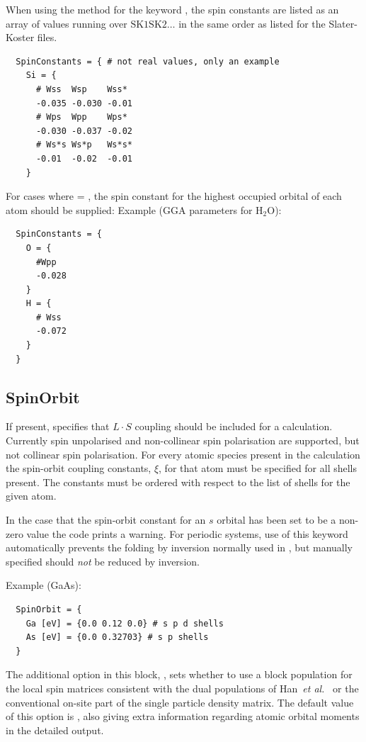 When using the  method for the keyword
, the spin constants are listed as an array of
values running over $\text{SK1}\text{SK2}\ldots$ in the same order as
listed for the Slater-Koster files.

\begin{verbatim}
  SpinConstants = { # not real values, only an example
    Si = {
      # Wss  Wsp    Wss*
      -0.035 -0.030 -0.01
      # Wps  Wpp    Wps*
      -0.030 -0.037 -0.02
      # Ws*s Ws*p   Ws*s*
      -0.01  -0.02  -0.01
    }
\end{verbatim}

For cases where  = , the spin constant for the
highest occupied orbital of each atom should be supplied: Example (GGA parameters
for H$_2$O):
\begin{verbatim}
  SpinConstants = {
    O = {
      #Wpp
      -0.028
    }
    H = {
      # Wss
      -0.072
    }
  }
\end{verbatim}

\subsection{SpinOrbit}
\label{sec:dftbp.SpinOrbit}

If present, specifies that $L \cdot S$ coupling should be included for
a calculation. Currently spin unpolarised and non-collinear spin
polarisation are supported, but not collinear spin polarisation. For
every atomic species present in the calculation the spin-orbit
coupling constants, $\xi$, for that atom must be specified for all
shells present.  The constants must be ordered with respect to the
list of shells for the given atom.

In the case that the spin-orbit constant for an $s$ orbital has been
set to be a non-zero value the code prints a warning. For periodic
systems, use of this keyword automatically prevents the folding by
inversion normally used in , but manually
specified  should {\em not} be reduced by
inversion.

Example (GaAs):
\begin{verbatim}
  SpinOrbit = {
    Ga [eV] = {0.0 0.12 0.0} # s p d shells
    As [eV] = {0.0 0.32703} # s p shells
  }
\end{verbatim}

The additional option in this block, , sets whether to use a block
population for the local spin matrices consistent with the dual populations of
Han~{\it et al.}~\cite{han-PRB-73-045110} or the conventional on-site part of
the single particle density matrix. The default value of this option is
, also giving extra information regarding atomic orbital moments in the
detailed output.

